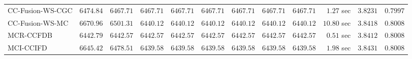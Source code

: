 \begin{table}[H]
\begin{tabular}{lrrrrrrrrrrr}
    CC-Fusion-WS-CGC & $      6474.84$ & $      6467.71$ & $      6467.71$ & $      6467.71$ & $      6467.71$ & $      6467.71$ & $      6467.71$ & $      6467.71$ & $         1.27$ sec    & $       3.8231$  & $       0.7997$ \\ 
     CC-Fusion-WS-MC & $      6670.96$ & $      6501.31$ & $      6440.12$ & $      6440.12$ & $      6440.12$ & $      6440.12$ & $      6440.12$ & $      6440.12$ & $        10.80$ sec    & $       3.8418$  & $       0.8008$ \\ 
\cmidrule{1-1} 
           MCR-CCFDB & $      6442.79$ & $      6442.57$ & $      6442.57$ & $      6442.57$ & $      6442.57$ & $      6442.57$ & $      6442.57$ & $      6442.57$ & $         0.51$ sec    & $       3.8412$  & $       0.8008$ \\ 
\cmidrule{1-1} 
           MCI-CCIFD & $      6645.42$ & $      6478.51$ & $      6439.58$ & $      6439.58$ & $      6439.58$ & $      6439.58$ & $      6439.58$ & $      6439.58$ & $         1.98$ sec    & $       3.8431$  & $       0.8008$ \\ 
\bottomrule
\end{tabular}
\end{table}

